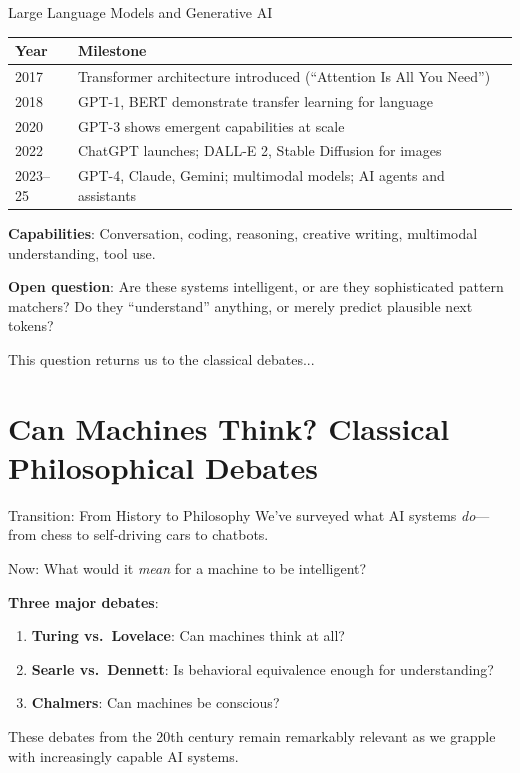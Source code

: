 \documentclass[aspectratio=169,11pt]{beamer}
\begin{document}
\begin{frame}{Large Language Models and Generative AI}
\begin{table}[h]
\centering
\scriptsize
\begin{tabular}{@{}ll@{}}
\toprule
\textbf{Year} & \textbf{Milestone} \\
\midrule
2017 & Transformer architecture introduced (``Attention Is All You Need'') \\
2018 & GPT-1, BERT demonstrate transfer learning for language \\
2020 & GPT-3 shows emergent capabilities at scale \\
2022 & ChatGPT launches; DALL-E 2, Stable Diffusion for images \\
2023--25 & GPT-4, Claude, Gemini; multimodal models; AI agents and assistants \\
\bottomrule
\end{tabular}
\end{table}

\vspace{0.2em}
\textbf{Capabilities}: Conversation, coding, reasoning, creative writing, multimodal understanding, tool use.

\vspace{0.2em}
\textbf{Open question}: Are these systems intelligent, or are they sophisticated pattern matchers? Do they ``understand'' anything, or merely predict plausible next tokens?

\vspace{0.2em}
This question returns us to the classical debates...
\end{frame}

\section{Can Machines Think? Classical Philosophical Debates}

\begin{frame}{Transition: From History to Philosophy}
We've surveyed what AI systems \emph{do}---from chess to self-driving cars to chatbots.

\vspace{0.3em}
Now: What would it \emph{mean} for a machine to be intelligent?

\vspace{0.3em}
\textbf{Three major debates}:
\begin{enumerate}
    \item \textbf{Turing vs.\ Lovelace}: Can machines think at all?
    \item \textbf{Searle vs.\ Dennett}: Is behavioral equivalence enough for understanding?
    \item \textbf{Chalmers}: Can machines be conscious?
\end{enumerate}

\vspace{0.3em}
These debates from the 20th century remain remarkably relevant as we grapple with increasingly capable AI systems.
\end{frame}
\end{document}
